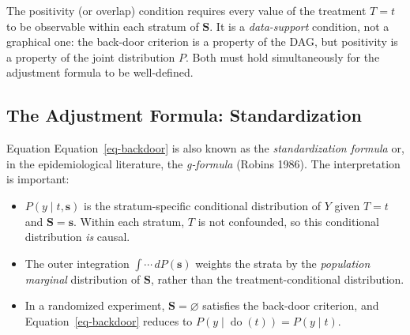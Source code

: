 \documentclass[
  a4paper,
]{book}
\providecommand{\tightlist}{%
  \setlength{\itemsep}{0pt}\setlength{\parskip}{0pt}}
\newcommand{\doop}{\operatorname{do}}
\begin{document}
\begin{tcolorbox}[enhanced jigsaw, arc=.35mm, bottomrule=.15mm, bottomtitle=1mm, breakable, colback=white, colbacktitle=quarto-callout-note-color!10!white, colframe=quarto-callout-note-color-frame, coltitle=black, left=2mm, leftrule=.75mm, opacityback=0, opacitybacktitle=0.6, rightrule=.15mm, title={Remark: Positivity}, titlerule=0mm, toprule=.15mm, toptitle=1mm]

The positivity (or overlap) condition requires every value of the
treatment \(T{=}t\) to be observable within each stratum of
\(\mathbf{S}\). It is a \emph{data-support} condition, not a graphical
one: the back-door criterion is a property of the DAG, but positivity is
a property of the joint distribution \(P\). Both must hold
simultaneously for the adjustment formula to be well-defined.

\end{tcolorbox}

\subsection{The Adjustment Formula:
Standardization}\label{the-adjustment-formula-standardization}

Equation Equation~\ref{eq-backdoor} is also known as the
\emph{standardization formula} or, in the epidemiological literature,
the \emph{g-formula} (Robins 1986). The interpretation is important:

\begin{itemize}
\tightlist
\item
  \(P(y \mid t, \mathbf{s})\) is the stratum-specific conditional
  distribution of \(Y\) given \(T{=}t\) and \(\mathbf{S}{=}\mathbf{s}\).
  Within each stratum, \(T\) is not confounded, so this conditional
  distribution \emph{is} causal.
\item
  The outer integration \(\int \cdots\, dP(\mathbf{s})\) weights the
  strata by the \emph{population marginal} distribution of
  \(\mathbf{S}\), rather than the treatment-conditional distribution.
\item
  In a randomized experiment, \(\mathbf{S} = \varnothing\) satisfies the
  back-door criterion, and Equation~\ref{eq-backdoor} reduces to
  \(P(y \mid \doop(t)) = P(y \mid t)\).
\end{itemize}
\end{document}
